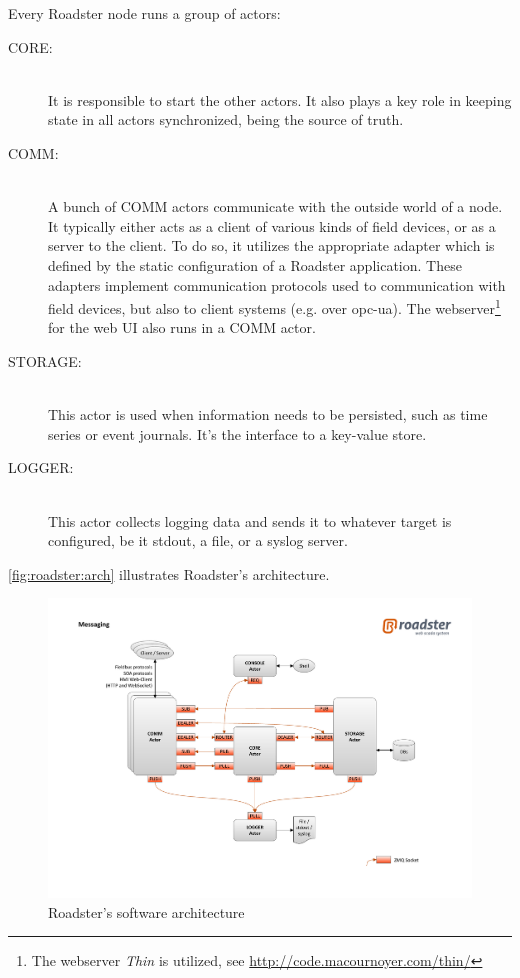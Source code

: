 Every Roadster node runs a group of actors:

\begin{description}
	\item [CORE:]\hfill\\
		It is responsible to start the other actors. It also plays a
		key role in keeping state in all actors synchronized, being the
		source of truth.

	\item [COMM:]\hfill\\
		A bunch of COMM actors communicate with the outside world of a
		node. It typically either acts as a client of various kinds of
		field devices, or as a server to the client. To do so, it
		utilizes the appropriate adapter which is defined by the static
		configuration of a Roadster application. These adapters
		implement communication protocols used to communication with
		field devices, but also to client systems (e.g. over
		\gls{opc-ua}). The webserver\footnote{The webserver \emph{Thin}
		is utilized, see \url{http://code.macournoyer.com/thin/}} for the
		web UI also runs in a COMM actor.

	\item [STORAGE:]\hfill\\
		This actor is used when information needs to be persisted, such
		as time series or event journals. It's the interface to a
		key-value store.

	\item [LOGGER:]\hfill\\
		This actor collects logging data and sends it to whatever
		target is configured, be it \gls{stdout}, a file, or a syslog server.
\end{description}

\autoref{fig:roadster:arch} illustrates Roadster's architecture.

\begin{figure}[]
	\includegraphics[trim=4cm 2cm 3.5cm 2.8cm, clip=true, width=\textwidth]{img/roadster_arch.pdf}
	\caption{Roadster's software architecture}
	\label{fig:roadster:arch}
\end{figure}

